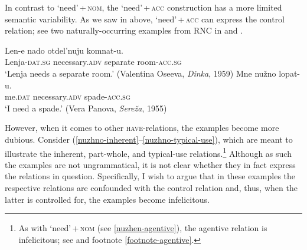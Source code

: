 \documentclass[output=paper]{langscibook}
\begin{document}
In contrast to `need'\,+\,\textsc{nom}, the `need'\,+\,\textsc{acc} construction has a more limited semantic variability. As we saw in  above, `need'\,+\,\textsc{acc} can express the control relation; see two naturally-occurring examples from RNC in  and .


\ea
\ea\label{nuzhno-control-corpus-1}
\gll Len-e nado otdel'nuju komnat-u.\\
Lenja-\textsc{dat.sg} necessary.\textsc{adv} separate room-\textsc{acc.sg}\\
\glt `Lenja needs a separate room.’ \hfill (Valentina Oseeva, \textit{Dinka}, 1959)
\ex \label{nuzhno-control-corpus-2}
\gll Mne nužno lopat-u.\\
me.\textsc{dat} necessary.\textsc{adv} spade-\textsc{acc.sg}\\
\glt ‘I need a spade.’ \hfill (Vera Panova, \textit{Sereža}, 1955)
\z\z

\noindent However, when it comes to other \textsc{have}-relations, the examples become more dubious. Consider (\ref{nuzhno-inherent}--\ref{nuzhno-typical-use}), which are meant to illustrate the inherent, part-whole, and typical-use relations.\footnote{As with `need'\,+\,\textsc{nom} (see \ref{nuzhen-agentive}), the agentive relation is infelicitous; see  and footnote \ref{footnote-agentive}.

\z
} Although as such the examples are not ungrammatical, it is not clear whether they in fact express the relations in question. Specifically, I wish to argue that in these examples the respective relations are confounded with the control relation and, thus, when the latter is controlled for, the examples become infelicitous.

\ea{}
\z\z
\end{document}
